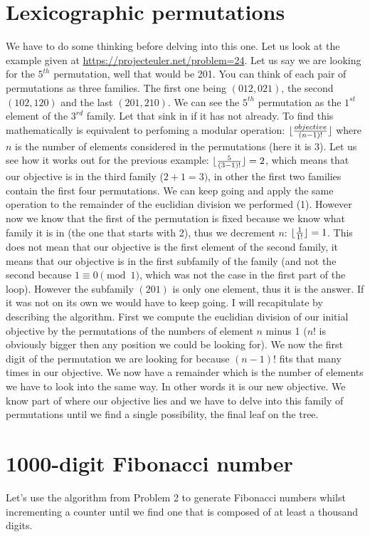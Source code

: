 \documentclass[11pt]{article}
\begin{document}
\section{Lexicographic permutations} 
We have to do some thinking before delving into this one. Let us look at the example given at \url{https://projecteuler.net/problem=24}. Let us say we are looking for the $5^{th}$ permutation, well that would be 201. You can think of each pair of permutations as three families. The first one being $(012, 021)$, the second $(102, 120)$ and the last $(201, 210)$. We can see the $5^{th}$ permutation as the $1^{st}$ element of the $3^{rd}$ family. Let that sink in if it has not already. To find this mathematically is equivalent to perfoming a modular operation: $\lfloor{objective \over (n-1)!}\rfloor$ where $n$ is the number of elements considered in the permutations (here it is 3). Let us see how it works out for the previous example: $\lfloor{5 \over (3-1)!}\rfloor=2$, which means that our objective is in the third family ($2+1=3)$, in other the first two families contain the first four permutations. We can keep going and apply the same operation to the remainder of the euclidian division we performed (1). However now we know that the first of the permutation is fixed because we know what family it is in (the one that starts with 2), thus we decrement $n$: $\lfloor{1 \over 1!}\rfloor=1$. This does not mean that our objective is the first element of the second family, it means that our objective is in the first subfamily of the family (and not the second because $1 \equiv 0 \pmod 1$, which was not the case in the first part of the loop). However the subfamily $(201)$ is only one element, thus it is the answer. If it was not on its own we would have to keep going. I will recapitulate by describing the algorithm. First we compute the euclidian division of our initial objective by the permutations of the numbers of element $n$ minus 1 ($n!$ is obviously bigger then any position we could be looking for). We now the first digit of the permutation we are looking for because $(n-1)!$ fits that many times in our objective. We now have a remainder which is the number of elements we have to look into the same way. In other words it is our new objective. We know part of where our objective lies and we have to delve into this family of permutations until we find a single possibility, the final leaf on the tree.

\section{1000-digit Fibonacci number}
Let's use the algorithm from Problem 2 to generate Fibonacci numbers whilst incrementing a counter until we find one that is composed of at least a thousand digits.
\end{document}
